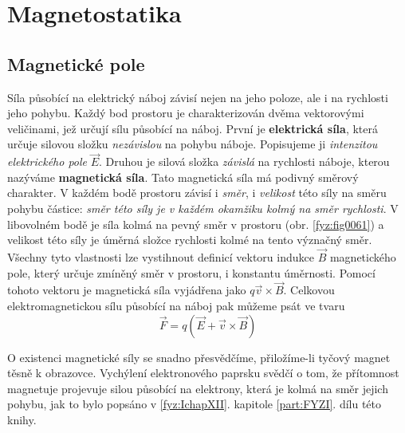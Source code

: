 \setchaptertoc
\chapter{Magnetostatika}\label{fyz:IIchapXIII}


  \section{Magnetické pole}\label{fyz:IIchapXIIIsecI}
    \cite[s.~224]{Feynman02} Síla působící na elektrický náboj závisí nejen na jeho poloze, ale i 
    na rychlosti jeho pohybu. Každý bod prostoru je charakterizován dvěma vektorovými veličinami, 
    jež určují sílu působící na náboj. První je \textbf{elektrická síla}, která určuje silovou 
    složku \emph{nezávislou} na pohybu náboje. Popisujeme ji \emph{intenzitou elektrického pole} 
    \(\vec{E}\). Druhou je silová složka \emph{závislá} na rychlosti náboje, kterou nazýváme 
    \textbf{magnetická síla}. Tato magnetická síla má podivný směrový charakter. V každém bodě 
    prostoru závisí i \emph{směr}, i \emph{velikost} této síly na směru pohybu částice: \emph{směr 
    této síly je v každém okamžiku kolmý na směr rychlosti}. V libovolném bodě je síla kolmá na 
    pevný směr v prostoru (obr. \ref{fyz:fig0061}) a velikost této síly je úměrná složce 
    rychlosti kolmé na tento význačný směr. Všechny tyto vlastnosti lze vystihnout definicí vektoru 
    indukce \(\vec{B}\) magnetického pole, který určuje zmíněný směr v prostoru, i konstantu 
    úměrnosti. Pomocí tohoto vektoru je magnetická síla vyjádřena jako \(q\vec{v}\times\vec{B}\).
    Celkovou elektromagnetickou sílu působící na náboj pak můžeme psát ve tvaru
    \begin{equation}\label{fyz:eq823}
      \vec{F} = q(\vec{E} + \vec{v}\times\vec{B})
    \end{equation} 

    O existenci magnetické síly se snadno přesvědčíme, přiložíme-li tyčový magnet těsně k obrazovce.
    Vychýlení elektronového paprsku svědčí o tom, že přítomnost magnetuje projevuje silou působící
    na elektrony, která je kolmá na směr jejich pohybu, jak to bylo popsáno v \ref{fyz:IchapXII}.
    kapitole \ref{part:FYZI}. dílu této knihy.

